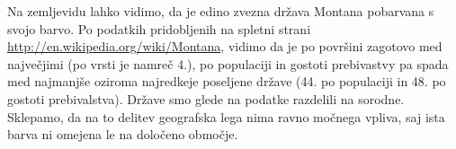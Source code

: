 \documentclass[11pt,a4paper]{article}
\begin{document}

Na zemljevidu lahko vidimo, da je edino zvezna država Montana pobarvana s svojo barvo. Po podatkih pridobljenih na spletni strani \url{http://en.wikipedia.org/wiki/Montana}, vidimo da je po površini zagotovo med največjimi (po vrsti je namreč 4.), po populaciji in gostoti prebivastvy pa spada med najmanjše oziroma najredkeje poseljene države (44. po populaciji in 48. po gostoti prebivalstva). Države smo glede na podatke razdelili na sorodne. Sklepamo, da na to delitev geografska lega nima ravno močnega vpliva, saj ista barva ni omejena le na določeno območje.
\end{document}
